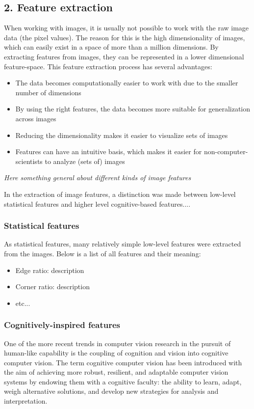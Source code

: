 \subsection{2. Feature extraction}
When working with images, it is usually not possible to work with the raw image data (the pixel values). The reason for this is the high dimensionality of images, which can easily exist in a space of more than a million dimensions. By extracting features from images, they can be represented in a lower dimensional feature-space.  This feature extraction process has several advantages:
\begin{itemize}
\item The data becomes computationally easier to work with due to the smaller number of dimensions
\item By using the right features, the data becomes more suitable for generalization across images
\item Reducing the dimensionality makes it easier to visualize sets of images
\item Features can have an intuitive basis, which makes it easier for non-computer-scientists to analyze (sets of) images
\end{itemize}
\textit{Here something general about different kinds of image features}

In the extraction of image features, a distinction was made between low-level statistical features and higher level cognitive-based features....

\subsubsection{Statistical features}
As statistical features, many relatively simple low-level features were extracted from the images. Below is a list of all features and their meaning:
\begin{itemize}
\item Edge ratio: description
\item Corner ratio: description
\item etc...
\end{itemize}

\subsubsection{Cognitively-inspired features}
One of the more recent trends in computer vision research in the pursuit of human-like capability is the coupling of cognition and vision into cognitive computer vision. 
The term cognitive computer vision has been introduced with the aim of achieving more robust, resilient, and adaptable computer vision systems by endowing them with a cognitive faculty: the ability to learn, adapt, weigh alternative solutions, and develop new strategies for analysis and interpretation.

